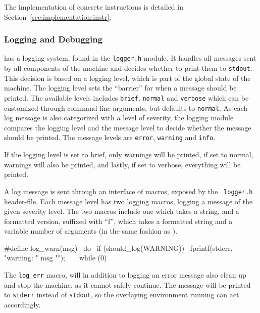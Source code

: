 The implementation of concrete instructions is detailed in
Section~\ref{sec:implementation:instr}.

\subsubsection{Logging and Debugging}
\label{sec:implementation:core:debug}

\thename{} has a logging system, found in the {\tt logger.h} module. It handles
all messages sent by all components of the machine and decides whether to print
them to {\tt stdout}. This decision is based on a logging level, which is part
of the global state of the machine. The logging level sets the ``barrier'' for
when a message should be printed. The available levels includes {\tt brief},
{\tt normal} and {\tt verbose} which can be customized through command-line
arguments, but defaults to {\tt normal}. As each log message is also categorized
with a level of severity, the logging module compares the logging level and the
message level to decide whether the message should be printed. The message
levels are {\tt error}, {\tt warning} and {\tt info}.

If the logging level is set to brief, only warnings will be printed, if set to
normal, warnings will also be printed, and lastly, if set to verbose, everything
will be printed.

A log message is sent through an interface of macros, exposed by the {\tt
  logger.h} header-file. Each message level has two logging macros, logging a
message of the given severity level. The two macros include one which takes a
string, and a formatted version, suffixed with ``f'', which takes a formatted
string and a variable number of arguments (in the same fashion as
).

\begin{ccode}
#define log_warn(msg)                             \
  do {                                            \
      if (should_log(WARNING)) {                  \
          fprintf(stderr, "warning: " msg "\n");  \
      }                                           \
  } while (0)
\end{ccode}

The {\tt log\_err} macro, will in addition to logging an error message also
clean up and stop the machine, as it cannot safely continue. The message will be
printed to {\tt stderr} instead of {\tt stdout}, so the overlaying environment
running \thename{} can act accordingly.

